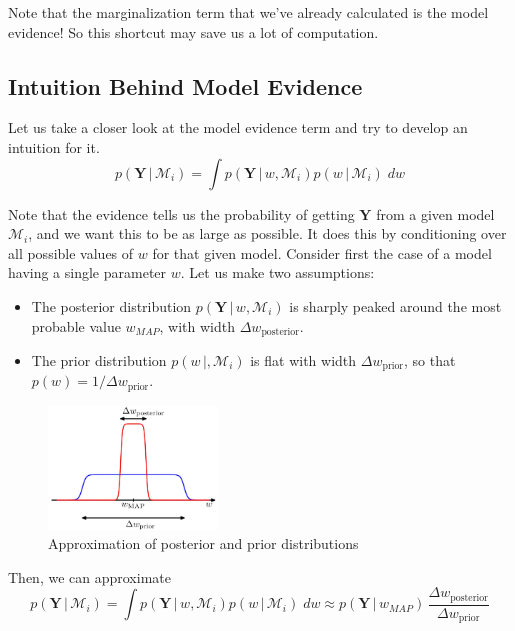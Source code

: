   Note that the marginalization term that we've already calculated is the model evidence! So this shortcut may save us a lot of computation.

\subsection{Intuition Behind Model Evidence}

  Let us take a closer look at the model evidence term and try to develop an intuition for it.
  \begin{equation}
    p(\mathbf{Y} \,|\,\mathcal{M}_i) = \int p(\mathbf{Y}\,|\,w, \mathcal{M}_i) p(w\,|\,\mathcal{M}_i) \; dw
  \end{equation}

  Note that the evidence tells us the probability of getting $\mathbf{Y}$ from a given model $\mathcal{M}_i$, and we want this to be as large as possible. It does this by conditioning over all possible values of $w$ for that given model. Consider first the case of a model having a single parameter $w$. Let us make two assumptions:
  \begin{itemize}
    \item The posterior distribution $p(\mathbf{Y}\,|\,w, \mathcal{M}_i)$ is sharply peaked around the most probable value $w_{MAP}$, with width $\Delta w_{\text{posterior}}$.
    \item The prior distribution $p(w\,|,\mathcal{M}_i)$ is flat with width $\Delta w_{\text{prior}}$, so that $p(w) = 1/ \Delta w_{\text{prior}}$.
  \end{itemize}

  \begin{figure}[H]
    \centering
    \includegraphics[width=0.4\textwidth]{img/approximation.jpg}
    \caption{Approximation of posterior and prior distributions}
  \end{figure}

  Then, we can approximate
  \begin{equation}
    p(\mathbf{Y}\,|\,\mathcal{M}_i) = \int p(\mathbf{Y}\,|\,w, \mathcal{M}_i) p(w\,|\,\mathcal{M}_i)\; dw \approx p(\mathbf{Y}\,|\,w_{MAP}) \, \frac{\Delta w_{\text{posterior}}}{\Delta w_{\text{prior}}}
  \end{equation}

